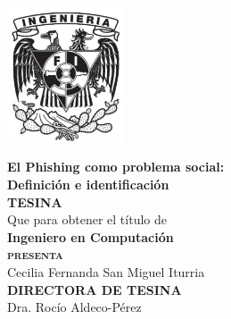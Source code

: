 \documentclass[letterpaper,12pt,oneside]{book}
\begin{document}
\begin{titlepage}
        \begin{minipage}[c][0.81\textheight][t]{0.25\textwidth}
            \vspace*{5mm}
            \begin{center}
                \hskip2.0mm
                \vrule width2.5pt height13cm 
                \vspace{5mm}
                \hskip4mm
                \vrule width2.5pt height13cm \\
                \vspace{5mm}
                \includegraphics[height=4.0cm]{Escudo-FI.jpeg}
            \end{center}
        \end{minipage}
        \begin{minipage}[c][0.81\textheight][t]{0.75\textwidth}
            \begin{center}
                \vspace{1cm}
                {\large\textbf{El Phishing como problema social:\\[0.2cm] Definición e identificación}}\\[.2in]
                \vspace{2cm}            
                \textsc{\large \textbf{TESINA}}\\[0.5cm]
                Que para obtener el t\'itulo de\\[0.5cm]
                \large \textbf{Ingeniero en Computación}\\
                \vspace{2.5cm}
                \textsc{\large \textbf{ p\hspace{0.2cm}r\hspace{0.2cm}e\hspace{0.2cm}s\hspace{0.2cm}e\hspace{0.2cm}n\hspace{0.2cm}t\hspace{0.2cm}a}}\\[0.2cm]
                Cecilia Fernanda San Miguel Iturria\\[2.5cm]          
                {\large\textbf{DIRECTORA DE TESINA}}\\[0.3cm] 
                Dra. Rocío Aldeco-Pérez\\[.2in]
                \vspace{1cm}
                \small{}
            \end{center}
        \end{minipage}
    \end{titlepage}
\end{document}
